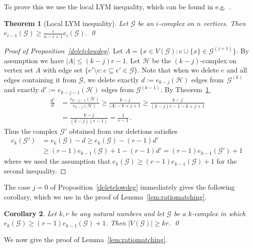\documentclass[12pt,a4paper]{amsart}
\newtheorem{theorem}{Theorem}%
\newtheorem{corollary}[theorem] {Corollary}
\newcommand{\Hy}{\mathcal{H}}
\newcommand{\cG}{\mathcal{G}}
\begin{document}
To prove this we use the local LYM inequality, which can be found in e.g.~\cite{bollobas}.

\begin{theorem}[Local LYM inequality]\label{thm:kk}
  Let $\cG$ be an $i$-complex on $n$ vertices. 
 Then $e_{i-1}(\cG) \geq \frac{i}{n-i+1} e_i(\cG)$. \qed
\end{theorem}
  
  \begin{proof}[Proof of Proposition~\ref{deletelowdeg}]
Let $A = \{x \in V(\cG) : e \cup \{x\} \in \cG^{(j+1)}\}$. By assumption we have $|A| \leq (k-j)r-1$. Let $\Hy$ be the $(k-j)$-complex on vertex set $A$ with edge set $\{e' \setminus e : e \subseteq e' \in \cG\}$. Note that when we delete $e$ and all edges containing it from $\cG$, we delete exactly $d := e_{k-j}(\Hy)$ edges from~$\cG^{(k)}$ and exactly $d' := e_{k-j-1}(\Hy)$ edges from $\cG^{(k-1)}$.
By Theorem~\ref{thm:kk},
    \begin{equation*}\begin{split}
      \frac{d'}{d} 
      &= \frac{e_{k-j-1}(\Hy)}{e_{k-j}(\Hy)}
      \geq \frac{k-j}{|A|-k+j+1}
      \geq \frac{k-j}{(k-j)r-1-k+j+1} \\
      &= \frac{k-j}{(k-j)(r-1)}
      = \frac{1}{r-1}\,.
    \end{split}\end{equation*}
    Thus the complex $\cG'$ obtained from our deletions satisfies
    \begin{equation*}\begin{split}
      e_k(\cG')
      &=e_k(\cG)-d 
      \ge e_k(\cG)-(r-1)d' \\
      &\geq (r-1)e_{k-1}(\cG)+1-(r-1)d' 
      =(r-1)e_{k-1}(\cG')+1 \,
    \end{split}\end{equation*}
    where we used the assumption that $e_k(\cG)\geq (r-1)e_{k-1}(\cG)+1$
    for the second inequality.
  \end{proof}

The case $j=0$ of Proposition~\ref{deletelowdeg} immediately gives the following corollary, which we use in the proof of Lemma~\ref{lem:ratiomatching}.

\begin{corollary}\label{bigenough} 
  Let $k,r$ be any natural numbers and let
  $\cG$ be a $k$-complex in which $e_k(\cG)\geq (r-1)e_{k-1}(\cG)+1$. Then
  $|V(\cG)| \ge kr$. \qed
\end{corollary}

We now give the proof of Lemma~\ref{lem:ratiomatching}.
\end{document}

